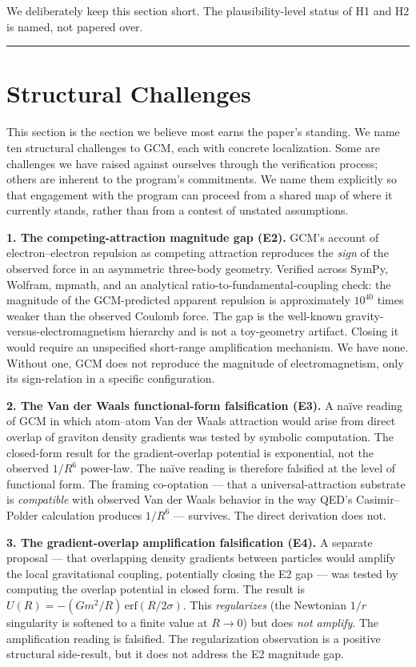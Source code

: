 \documentclass[12pt]{article}
\theoremstyle{definition}
\theoremstyle{remark}
\begin{document}
We deliberately keep this section short. The plausibility-level status
of H1 and H2 is named, not papered over.

\begin{center}\rule{0.5\linewidth}{0.5pt}\end{center}

\section{Structural Challenges}\label{sec:challenges}

This section is the section we believe most earns the paper's standing.
We name ten structural challenges to GCM, each with concrete
localization. Some are challenges we have raised against ourselves
through the verification process; others are inherent to the program's
commitments. We name them explicitly so that engagement with the program
can proceed from a shared map of where it currently stands, rather than
from a contest of unstated assumptions.

\textbf{1. The competing-attraction magnitude gap (E2).} GCM's account
of electron--electron repulsion as competing attraction reproduces the
\emph{sign} of the observed force in an asymmetric three-body geometry.
Verified across SymPy, Wolfram, mpmath, and an analytical
ratio-to-fundamental-coupling check: the magnitude of the GCM-predicted
apparent repulsion is approximately \(10^{40}\) times weaker than the
observed Coulomb force. The gap is the well-known
gravity-versus-electromagnetism hierarchy and is not a toy-geometry
artifact. Closing it would require an unspecified short-range
amplification mechanism. We have none. Without one, GCM does not
reproduce the magnitude of electromagnetism, only its sign-relation in a
specific configuration.

\textbf{2. The Van der Waals functional-form falsification (E3).} A
naïve reading of GCM in which atom--atom Van der Waals attraction would
arise from direct overlap of graviton density gradients was tested by
symbolic computation. The closed-form result for the gradient-overlap
potential is exponential, not the observed \(1/R^6\) power-law. The
naïve reading is therefore falsified at the level of functional form.
The framing co-optation --- that a universal-attraction substrate is
\emph{compatible} with observed Van der Waals behavior in the way QED's
Casimir--Polder calculation produces \(1/R^6\) --- survives. The direct
derivation does not.

\textbf{3. The gradient-overlap amplification falsification (E4).} A
separate proposal --- that overlapping density gradients between
particles would amplify the local gravitational coupling, potentially
closing the E2 gap --- was tested by computing the overlap potential in
closed form. The result is
\(U(R) = -(Gm^2/R)\,\mathrm{erf}(R/2\sigma)\). This \emph{regularizes}
(the Newtonian \(1/r\) singularity is softened to a finite value at
\(R \to 0\)) but does \emph{not amplify}. The amplification reading is
falsified. The regularization observation is a positive structural
side-result, but it does not address the E2 magnitude gap.
\end{document}
